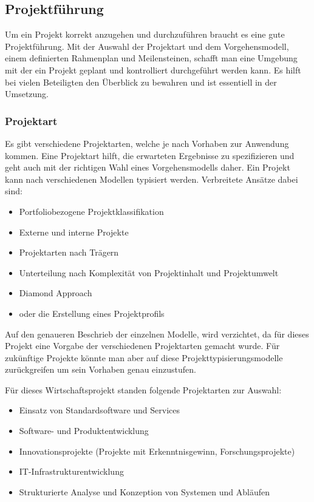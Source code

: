 \documentclass[a4paper, table]{article}
\begin{document}
\subsection{Projektführung}\label{project-management}
Um ein Projekt korrekt anzugehen und durchzuführen braucht es eine gute Projektführung.
Mit der Auswahl der Projektart und dem Vorgehensmodell, einem definierten Rahmenplan und Meilensteinen,
schafft man eine Umgebung mit der ein Projekt geplant und kontrolliert durchgeführt werden kann.
Es hilft bei vielen Beteiligten den Überblick zu bewahren und ist essentiell in der Umsetzung.

\subsubsection{Projektart}
Es gibt verschiedene Projektarten, welche je nach Vorhaben zur Anwendung kommen. Eine Projektart hilft, die erwarteten Ergebnisse zu spezifizieren
und geht auch mit der richtigen Wahl eines Vorgehensmodells daher.
\newline
Ein Projekt kann nach verschiedenen Modellen typisiert werden. Verbreitete Ansätze dabei sind:
\begin{itemize}
    \item Portfoliobezogene Projektklassifikation
    \item Externe und interne Projekte
    \item Projektarten nach Trägern
    \item Unterteilung nach Komplexität von Projektinhalt und Projektumwelt
    \item Diamond Approach
    \item oder die Erstellung eines Projektprofils\autocite{claus_husselmann_zielgerichtete_nodate} %
\end{itemize}
Auf den genaueren Beschrieb der einzelnen Modelle, wird verzichtet, da für dieses Projekt eine Vorgabe der verschiedenen Projektarten gemacht wurde.
Für zukünftige Projekte könnte man aber auf diese Projekttypisierungsmodelle zurückgreifen um sein Vorhaben genau einzustufen.
\newline

Für dieses Wirtschaftsprojekt standen folgende Projektarten zur Auswahl:
\begin{itemize}
    \item Einsatz von Standardsoftware und Services
    \item Software- und Produktentwicklung
    \item Innovationsprojekte (Projekte mit Erkenntnisgewinn, Forschungsprojekte)
    \item IT-Infrastrukturentwicklung
    \item Strukturierte Analyse und Konzeption von Systemen und Abläufen \autocite{oliver_gilbert_wipro_2022} %
\end{itemize}
\end{document}
